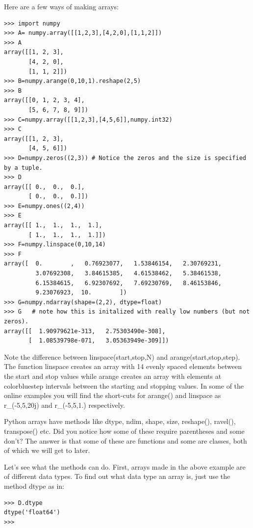 \documentclass[11pt]{book}
\begin{document}
{{{ Here are a few ways of making arrays:  
{ \color{blue} \begin{verbatim}
>>> import numpy
>>> A= numpy.array([[1,2,3],[4,2,0],[1,1,2]])
>>> A
array([[1, 2, 3],
       [4, 2, 0],
       [1, 1, 2]])
>>> B=numpy.arange(0,10,1).reshape(2,5)
>>> B
array([[0, 1, 2, 3, 4],
       [5, 6, 7, 8, 9]])
>>> C=numpy.array([[1,2,3],[4,5,6]],numpy.int32) 
>>> C
array([[1, 2, 3],
       [4, 5, 6]])
>>> D=numpy.zeros((2,3)) # Notice the zeros and the size is specified by a tuple.
>>> D
array([[ 0.,  0.,  0.],
       [ 0.,  0.,  0.]])
>>> E=numpy.ones((2,4))
>>> E
array([[ 1.,  1.,  1.,  1.],
       [ 1.,  1.,  1.,  1.]])
>>> F=numpy.linspace(0,10,14)
>>> F
array([  0.        ,   0.76923077,   1.53846154,   2.30769231,
         3.07692308,   3.84615385,   4.61538462,   5.38461538,
         6.15384615,   6.92307692,   7.69230769,   8.46153846,
         9.23076923,  10.        ])      
>>> G=numpy.ndarray(shape=(2,2), dtype=float) 
>>> G   # note how this is initalized with really low numbers (but not zeros).
array([[  1.90979621e-313,   2.75303490e-308],
       [  1.08539798e-071,   3.05363949e-309]])         
\end{verbatim}}

Note the difference between {\color{blue}linspace(start,stop,N)} and {\color{blue}arange(start,stop,step)}. The function {\color{blue}linspace} creates an array with 14 evenly spaced elements between the start and stop values while  {\color{blue}arange} creates an array with elements at {color{blue}step} intervals between the starting and stopping values.    In some of the online examples you will find the short-cuts for {\color{blue}arange()} and {\color{blue}linspace} as  {\color{blue}r\_(-5,5,20j)} and {\color{blue}r\_(-5,5,1.)} respectively.

Python arrays have methods like {\color{blue}dtype},  {\color{blue}ndim}, {\color{blue}shape}, {\color{blue}size}, {\color{blue}reshape()}, {\color{blue}ravel()},  {\color{blue}transpose()} etc.    Did you notice how some of these require parentheses and some don't? The answer is that some of these are functions and some are classes, both of which we will get to later.  

Let's see what the methods can do. 
First,  arrays made in the above example are of different data types. To find out what data type an array is, just use the method {\color{blue}dtype} as in:

{ \color{blue} \begin{verbatim}
>>> D.dtype
dtype('float64')
>>>
\end{verbatim}}



}}}
\end{document}
